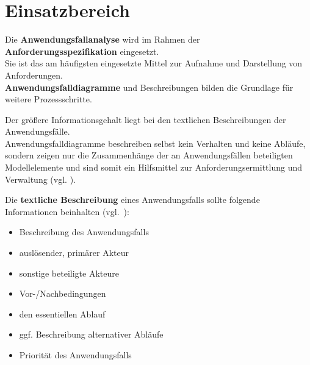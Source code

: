 \section{Einsatzbereich}

Die \textbf{Anwendungsfallanalyse} wird im Rahmen der \textbf{Anforderungsspezifikation} eingesetzt.\\

\noindent
Sie ist das am häufigsten eingesetzte Mittel zur Aufnahme und Darstellung von Anforderungen.\\

\noindent
\textbf{Anwendungsfalldiagramme} und Beschreibungen bilden die Grundlage für weitere Prozessschritte.

\vspace{2mm}
\begin{tcolorbox}
Der größere Informationsgehalt liegt bei den textlichen Beschreibungen der Anwendungsfälle.\\

\noindent
Anwendungsfalldiagramme beschreiben selbst kein Verhalten und keine Abläufe, sondern zeigen nur die Zusammenhänge der an Anwendungsfällen beteiligten Modellelemente und sind somit ein Hilfsmittel zur Anforderungsermittlung und Verwaltung (vgl. \cite[213]{Oes05}).
\end{tcolorbox}
\vspace{2mm}

\noindent
Die \textbf{textliche Beschreibung} eines Anwendungsfalls sollte folgende Informationen beinhalten (vgl.~\cite[51]{Buh09}):

\begin{itemize}
    \item Beschreibung des Anwendungsfalls
    \item auslösender, primärer Akteur
    \item sonstige beteiligte Akteure
    \item Vor-/Nachbedingungen
    \item den essentiellen Ablauf
    \item ggf. Beschreibung alternativer Abläufe
    \item Priorität des Anwendungsfalls
\end{itemize}
